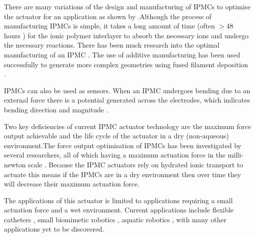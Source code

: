 There are many variations of the design and manufacturing of IPMCs to optimise the actuator for an application as shown by \cite{Shahinpoor2016}.Although the process of manufacturing IPMCs is simple, it takes a long amount of time (often $>$48 hours \citep{Ma2020}) for the ionic polymer interlayer to absorb the necessary ions and undergo the necessary reactions. There has been much research into the optimal manufacturing of an IPMC \citep{HOMMA1999,Liu1992,Shahinpoor2016}. The use of additive manufacturing has been used successfully to generate more complex geometries using fused filament deposition \citep{Carrico2015}.

IPMCs can also be used as sensors. When an IPMC undergoes bending due to an external force there is a potential generated across the electrodes, which indicates bending direction and magnitude \citep{Shahinpoor2004}.

Two key deficiencies of current IPMC actuator technology are the maximum force output achievable and the life cycle of the actuator in a dry (non-aqueous) environment.The force output optimisation of IPMCs has been investigated by several researchers, all of which having a maximum actuation force in the milli-newton scale \citep{Akle2004,Xu2014,Shahinpoor2004}. 
Because the IPMC actuators rely on hydrated ionic transport to actuate this means if the IPMCs are in a dry environment then over time they will decrease their maximum actuation force.

The applications of this actuator is limited to applications requiring a small actuation force and a wet environment. Current applications include flexible catheters \citep{Guo1994}, small biomimetic robotics \citep{Kodaira2019,Chang2013}, aquatic robotics \citep{Hubbard2014,Khawwaf2019}, with many other applications yet to be discovered.

